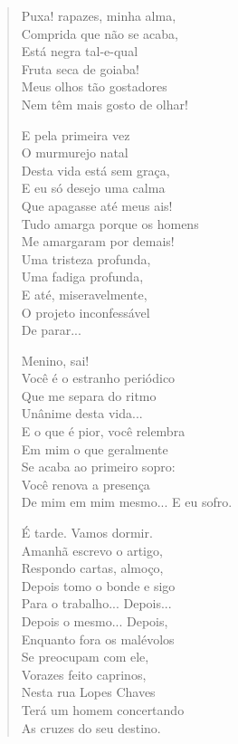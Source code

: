 \begin{verse}
Puxa! rapazes, minha alma,\\
Comprida que não se acaba,\\
Está negra tal-e-qual\\
Fruta seca de goiaba!\\
Meus olhos tão gostadores\\
Nem têm mais gosto de olhar!

E pela primeira vez\\
O murmurejo natal\\
Desta vida está sem graça,\\
E eu só desejo uma calma\\
Que apagasse até meus ais!\\
Tudo amarga porque os homens\\
Me amargaram por demais!\\
Uma tristeza profunda,\\
Uma fadiga profunda,\\
E até, miseravelmente,\\
O projeto inconfessável\\
De parar...

\hfill{}Menino, sai!\\
Você é o estranho periódico\\
Que me separa do ritmo\\
Unânime desta vida...\\
E o que é pior, você relembra\\
Em mim o que geralmente\\
Se acaba ao primeiro sopro:\\
Você renova a presença\\
De mim em mim mesmo... E eu sofro.

É tarde. Vamos dormir.\\
Amanhã escrevo o artigo,\\
Respondo cartas, almoço,\\
Depois tomo o bonde e sigo\\
Para o trabalho... Depois...\\
Depois o mesmo... Depois,\\
Enquanto fora os malévolos\\
Se preocupam com ele,\\
Vorazes feito caprinos,\\
Nesta rua Lopes Chaves\\
Terá um homem concertando\\
As cruzes do seu destino.
\end{verse}

